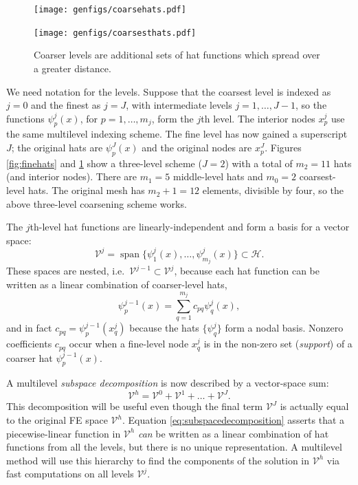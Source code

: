 \documentclass[letterpaper,final,12pt,reqno]{amsart}
\theoremstyle{claim}
\numberwithin{equation}{section}
\numberwithin{figure}{section}
\numberwithin{table}{section}
\begin{document}
\begin{figure}
\texttt{[image: genfigs/coarsehats.pdf]}
\smallskip

\texttt{[image: genfigs/coarsesthats.pdf]}
\caption{Coarser levels are additional sets of hat functions which spread over a greater distance.}
\label{fig:coarsehats}
\end{figure}

We need notation for the levels.  Suppose that the coarsest level is indexed as $j=0$ and the finest as $j=J$, with intermediate levels $j=1,\dots,J-1$, so the functions $\psi_p^j(x)$, for $p=1,\dots,m_j$, form the $j$th level.  The interior nodes $x_p^j$ use the same multilevel indexing scheme.  The fine level has now gained a superscript $J$; the original hats are $\psi_p^J(x)$ and the original nodes are $x_p^J$.  Figures \ref{fig:finehats} and \ref{fig:coarsehats} show a three-level scheme ($J=2$) with a total of $m_2=11$ hats (and interior nodes).  There are $m_1=5$ middle-level hats and $m_0=2$ coarsest-level hats.  The original mesh has $m_2+1=12$ elements, divisible by four, so the above three-level coarsening scheme works.

The $j$th-level hat functions are linearly-independent and form a basis for a vector space:
\begin{equation}
  \mathcal{V}^j = \operatorname{span}\{\psi_1^j(x),\dots,\psi_{m_j}^j(x)\} \subset \mathcal{H}.  \label{eq:definevk}
\end{equation}
These spaces are nested, i.e.~$\mathcal{V}^{j-1} \subset \mathcal{V}^j$, because each hat function can be written as a linear combination of coarser-level hats,
\begin{equation}
   \psi_p^{j-1}(x) = \sum_{q=1}^{m_j} c_{pq} \psi_q^j(x), \label{eq:hatcombination}
\end{equation}
and in fact $c_{pq} = \psi_p^{j-1}(x_q^j)$ because the hats $\{\psi_q^j\}$ form a nodal basis. Nonzero coefficients $c_{pq}$ occur when a fine-level node $x_q^j$ is in the non-zero set (\emph{support}) of a coarser hat $\psi_p^{j-1}(x)$.

A multilevel \emph{subspace decomposition} is now described by a vector-space sum:
\begin{equation}
  \mathcal{V}^h = \mathcal{V}^0 + \mathcal{V}^1 + \dots + \mathcal{V}^J. \label{eq:subspacedecomposition}
\end{equation}
This decomposition will be useful even though the final term $\mathcal{V}^J$ is actually equal to the original FE space $\mathcal{V}^h$.  Equation \eqref{eq:subspacedecomposition} asserts that a piecewise-linear function in $\mathcal{V}^h$ \emph{can} be written as a linear combination of hat functions from all the levels, but there is no unique representation.  A multilevel method will use this hierarchy to find the components of the solution in $\mathcal{V}^h$ via fast computations on all levels $\mathcal{V}^j$.
\end{document}
